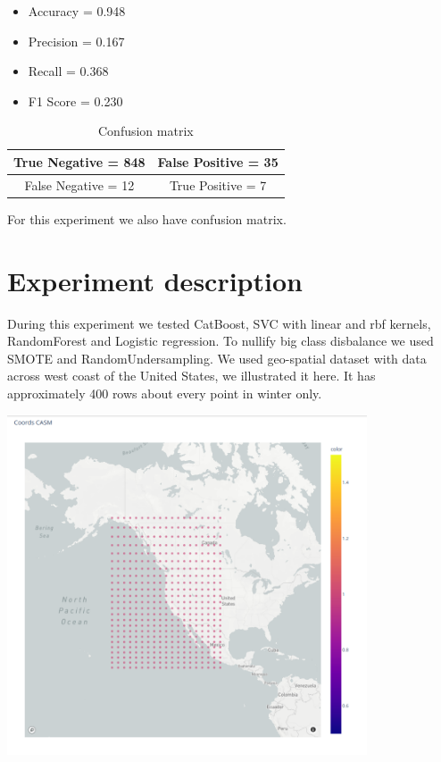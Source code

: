 \documentclass{article}
\begin{document}
\begin{itemize}
    \item Accuracy =  0.948
    \item Precision =  0.167
    \item Recall =  0.368
    \item F1 Score =  0.230
\end{itemize}


\begin{table}
		\begin{tabular}{|c|c|}
			\hline
			True Negative = 848 & False Positive = 35 \\ \hline
			False Negative = 12 &  True Positive = 7 \\ \hline
		\end{tabular}
		\caption{Confusion matrix}
\end{table}For this experiment we also have confusion matrix.

\section{Experiment description }
During this experiment we tested CatBoost, SVC with linear and rbf kernels, RandomForest and Logistic regression. To nullify big class disbalance we used SMOTE and RandomUndersampling. We used geo-spatial dataset with data across west coast of the United States, we illustrated it here. It has approximately 400 rows about every point in winter only.
\begin{center}
\caption{Dataset points on USA map}
\includegraphics[width=0.8\textwidth]{map.png}
\end{center}
\end{document}
